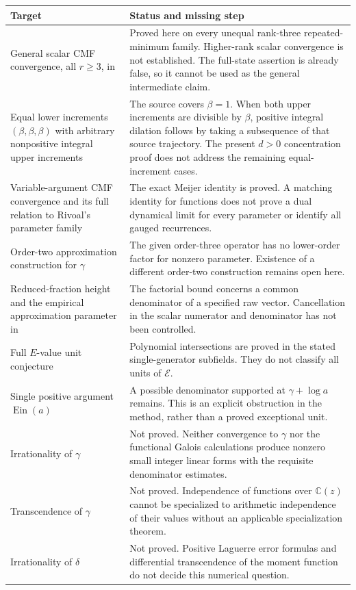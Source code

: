\documentclass[11pt,a4paper]{article}
\theoremstyle{definition}
\theoremstyle{remark}
\numberwithin{equation}{section}
\begin{document}
\begin{longtable}{@{}>{\raggedright\arraybackslash}p{}>{\raggedright\arraybackslash}p{}@{}}
\toprule
Target & Status and missing step \\
\midrule
\endhead
General scalar CMF convergence, all $r\ge3$, in~\cite[Conjecture 1]{p3:KMLWSK26}
& Proved here on every unequal rank-three repeated-minimum family.
Higher-rank scalar convergence is not established. The full-state assertion
is already false, so it cannot be used as the general intermediate claim.\\[6pt]
Equal lower increments $(\beta,\beta,\beta)$ with arbitrary nonpositive integral upper increments
& The source covers $\beta=1$. When both upper increments are divisible by
$\beta$, positive integral dilation follows by taking a subsequence of that
source trajectory. The present $d>0$ concentration proof does not address
the remaining equal-increment cases.\\[6pt]
Variable-argument CMF convergence and its full relation to Rivoal's parameter family~\cite[Section 9.2]{p3:KMLWSK26}
& The exact Meijer identity is proved. A matching identity for functions
does not prove a dual dynamical limit for every parameter or identify all
gauged recurrences.\\[6pt]
Order-two approximation construction for $\gamma$~\cite[Section 1]{p3:Riv09}
& The given order-three operator has no lower-order factor for nonzero
parameter. Existence of a different order-two construction remains open
here.\\[6pt]
Reduced-fraction height and the empirical approximation parameter in~\cite[Section 8.3]{p3:KMLWSK26}
& The factorial bound concerns a common denominator of a specified raw
vector. Cancellation in the scalar numerator and denominator has not been
controlled.\\[6pt]
Full $E$-value unit conjecture~\cite[Problem 6]{p3:RivoalXUPS2019}
& Polynomial intersections are proved in the stated single-generator
subfields. They do not classify all units of $\mathcal E$.\\[6pt]
Single positive argument $\operatorname{Ein}(a)$
& A possible denominator supported at $\gamma+\log a$ remains. This is an
explicit obstruction in the method, rather than a proved exceptional unit.\\[6pt]
Irrationality of $\gamma$
& Not proved. Neither convergence to $\gamma$ nor the functional Galois
calculations produce nonzero small integer linear forms with the requisite
denominator estimates.\\[6pt]
Transcendence of $\gamma$
& Not proved. Independence of functions over $\mathbb C(z)$ cannot be
specialized to arithmetic independence of their values without an
applicable specialization theorem.\\[6pt]
Irrationality of $\delta$
& Not proved. Positive Laguerre error formulas and differential
transcendence of the moment function do not decide this numerical question.\\
\bottomrule
\end{longtable}
\end{document}
